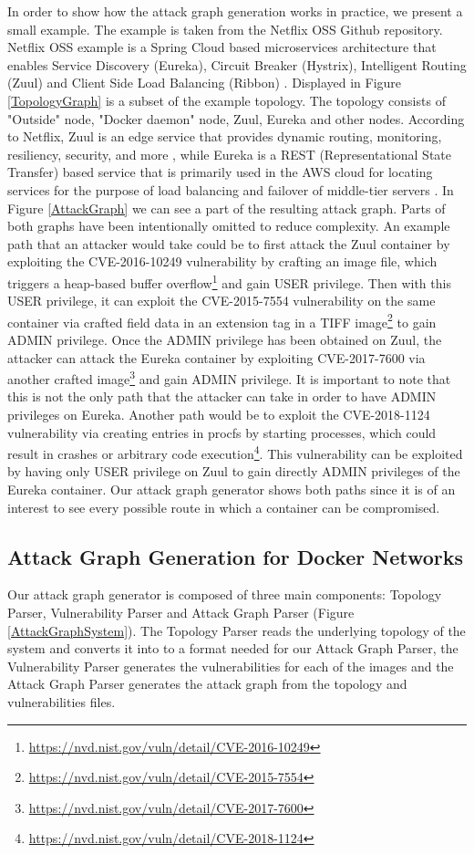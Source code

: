 In order to show how the attack graph generation works in practice, we present a small example. The example is taken from the Netflix OSS Github repository. Netflix OSS example is a Spring Cloud based microservices architecture that enables Service Discovery (Eureka), Circuit Breaker (Hystrix), Intelligent Routing (Zuul) and Client Side Load Balancing (Ribbon) \cite{netflixoss, springcloudnetflix}. Displayed in Figure \ref{TopologyGraph} is a subset of the example topology. The topology consists of "Outside" node, "Docker daemon" node, Zuul, Eureka and other nodes. According to Netflix, Zuul is an edge service that provides dynamic routing, monitoring, resiliency, security, and more \cite{netflixzuul}, while Eureka is a REST (Representational State Transfer) based service that is primarily used in the AWS cloud for locating services for the purpose of load balancing and failover of middle-tier servers \cite{netflixeureka}. In Figure \ref{AttackGraph} we can see a part of the resulting attack graph. Parts of both graphs have been intentionally omitted to reduce complexity. An example path that an attacker would take could be to first attack the Zuul container by exploiting the CVE-2016-10249 vulnerability by crafting an image file, which triggers a heap-based buffer overflow\footnote{\url{https://nvd.nist.gov/vuln/detail/CVE-2016-10249}} and gain USER privilege.  Then with this USER privilege, it can exploit the CVE-2015-7554 vulnerability on the same container via crafted field data in an extension tag in a TIFF image\footnote{\url{https://nvd.nist.gov/vuln/detail/CVE-2015-7554}} to gain ADMIN privilege. Once the ADMIN privilege has been obtained on Zuul, the attacker can attack the Eureka container by exploiting CVE-2017-7600 via another crafted image\footnote{\url{https://nvd.nist.gov/vuln/detail/CVE-2017-7600}} and gain ADMIN privilege. It is important to note that this is not the only path that the attacker can take in order to have ADMIN privileges on Eureka. Another path would be to exploit the CVE-2018-1124 vulnerability via creating entries in procfs by starting processes, which could result in crashes or arbitrary code execution\footnote{\url{https://nvd.nist.gov/vuln/detail/CVE-2018-1124}}. This vulnerability can be exploited by having only USER privilege on Zuul to gain directly ADMIN privileges of the Eureka container. Our attack graph generator shows both paths since it is of an interest to see every possible route in which a container can be compromised.



\subsection{Attack Graph Generation for Docker Networks}
\label{chap:technical}
Our attack graph generator is composed of three main components: Topology Parser, Vulnerability Parser and Attack Graph Parser (Figure \ref{AttackGraphSystem}). The Topology Parser reads the underlying topology of the system and converts it into to a format needed for our Attack Graph Parser, the Vulnerability Parser generates the vulnerabilities for each of the images and the Attack Graph Parser generates the attack graph from the topology and vulnerabilities files. 

